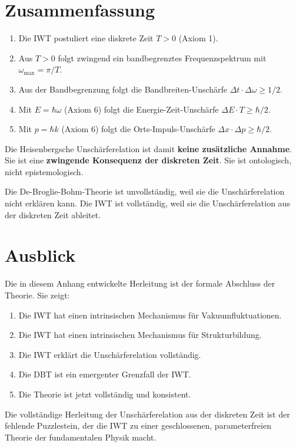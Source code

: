 \section{Zusammenfassung}
\label{app:unschaerfe_zusammenfassung}

\begin{enumerate}
    \item Die IWT postuliert eine diskrete Zeit $T > 0$ (Axiom 1).
    \item Aus $T > 0$ folgt zwingend ein bandbegrenztes Frequenzspektrum mit $\omega_{\max} = \pi/T$.
    \item Aus der Bandbegrenzung folgt die Bandbreiten-Unschärfe $\Delta t \cdot \Delta \omega \ge 1/2$.
    \item Mit $E = \hbar \omega$ (Axiom 6) folgt die Energie-Zeit-Unschärfe $\Delta E \cdot T \ge \hbar/2$.
    \item Mit $p = \hbar k$ (Axiom 6) folgt die Orts-Impuls-Unschärfe $\Delta x \cdot \Delta p \ge \hbar/2$.
\end{enumerate}

Die Heisenbergsche Unschärferelation ist damit \textbf{keine zusätzliche Annahme}. Sie ist eine \textbf{zwingende Konsequenz der diskreten Zeit}. Sie ist ontologisch, nicht epistemologisch.

Die De-Broglie-Bohm-Theorie ist unvollständig, weil sie die Unschärferelation nicht erklären kann. Die IWT ist vollständig, weil sie die Unschärferelation aus der diskreten Zeit ableitet.

\section{Ausblick}
\label{app:unschaerfe_ausblick}

Die in diesem Anhang entwickelte Herleitung ist der formale Abschluss der Theorie. Sie zeigt:

\begin{enumerate}
    \item Die IWT hat einen intrinsischen Mechanismus für Vakuumfluktuationen.
    \item Die IWT hat einen intrinsischen Mechanismus für Strukturbildung.
    \item Die IWT erklärt die Unschärferelation vollständig.
    \item Die DBT ist ein emergenter Grenzfall der IWT.
    \item Die Theorie ist jetzt vollständig und konsistent.
\end{enumerate}

Die vollständige Herleitung der Unschärferelation aus der diskreten Zeit ist der fehlende Puzzlestein, der die IWT zu einer geschlossenen, parameterfreien Theorie der fundamentalen Physik macht.